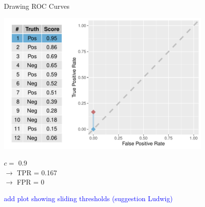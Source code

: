 
\begin{vbframe}{Drawing ROC Curves}


\begin{knitrout}\scriptsize
{}\color{fgcolor}

{
\includegraphics[width=0.8\textwidth]{figure/eval_mclass_roc_sp_5} 
}

\end{knitrout}

\vfill

\begin{minipage}[b]{0.3\textwidth}
  $c =$ 0.9\\ 
  $\rightarrow$ TPR = 0.167 \\
  $\rightarrow$ FPR = 0
\end{minipage}%
\begin{minipage}[b]{0.7\textwidth}
  \textcolor{blue}{add plot showing sliding thresholds (suggestion Ludwig)}
\end{minipage}

\end{vbframe}


